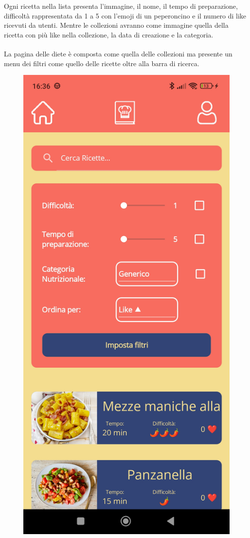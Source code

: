 ﻿\documentclass[a4paper,12pt]{report}
\begin{document}
\\\\Ogni ricetta nella lista presenta l'immagine, il nome, il tempo di preparazione, difficoltà rappresentata da 1 a 5 con l'emoji di un peperoncino e il numero di like ricevuti da utenti.
Mentre le collezioni avranno come immagine quella della ricetta con più like nella collezione, la data di creazione e la categoria.
\\\\La pagina delle diete è composta come quella delle collezioni ma presente un menu dei filtri come quello delle ricette oltre alla barra di ricerca.
\begin{figure}[h!]
    \begin{minipage}{.5\textwidth}
        \centering
        \includegraphics[width=0.9\linewidth]{app_images/Filter.jpg}

\end{minipage}
\end{figure}
\end{document}
